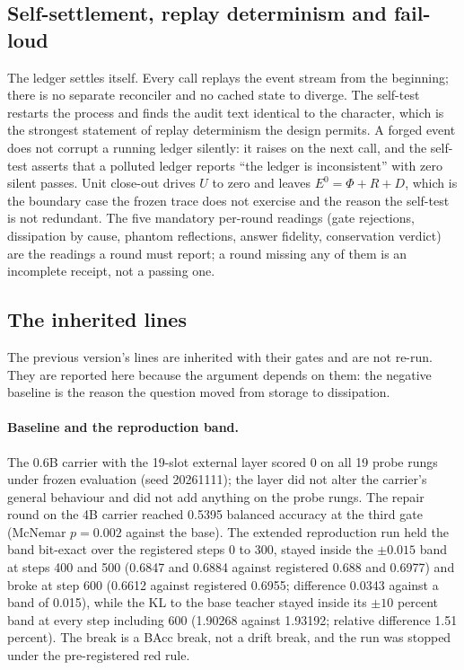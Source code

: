 \documentclass[11pt,a4paper]{article}
\newcommand{\Ezero}{E^{0}}
\begin{document}
\subsection{Self-settlement, replay determinism and fail-loud}
\label{sec:selftest}
The ledger settles itself. Every call replays the event stream from the beginning; there is no separate reconciler and no cached state to diverge. The self-test restarts the process and finds the audit text identical to the character, which is the strongest statement of replay determinism the design permits. A forged event does not corrupt a running ledger silently: it raises on the next call, and the self-test asserts that a polluted ledger reports ``the ledger is inconsistent'' with zero silent passes. Unit close-out drives $U$ to zero and leaves $\Ezero = \Phi+R+D$, which is the boundary case the frozen trace does not exercise and the reason the self-test is not redundant. The five mandatory per-round readings (gate rejections, dissipation by cause, phantom reflections, answer fidelity, conservation verdict) are the readings a round must report; a round missing any of them is an incomplete receipt, not a passing one.

\subsection{The inherited lines}
\label{sec:inherited}
The previous version's lines are inherited with their gates and are not re-run. They are reported here because the argument depends on them: the negative baseline is the reason the question moved from storage to dissipation.

\paragraph{Baseline and the reproduction band.}
The 0.6B carrier with the 19-slot external layer scored 0 on all 19 probe rungs under frozen evaluation (seed 20261111); the layer did not alter the carrier's general behaviour and did not add anything on the probe rungs. The repair round on the 4B carrier reached 0.5395 balanced accuracy at the third gate (McNemar $p = 0.002$ against the base). The extended reproduction run held the band bit-exact over the registered steps 0 to 300, stayed inside the $\pm 0.015$ band at steps 400 and 500 (0.6847 and 0.6884 against registered 0.688 and 0.6977) and broke at step 600 (0.6612 against registered 0.6955; difference 0.0343 against a band of 0.015), while the KL to the base teacher stayed inside its $\pm 10$ percent band at every step including 600 (1.90268 against 1.93192; relative difference 1.51 percent). The break is a BAcc break, not a drift break, and the run was stopped under the pre-registered red rule.
\end{document}
